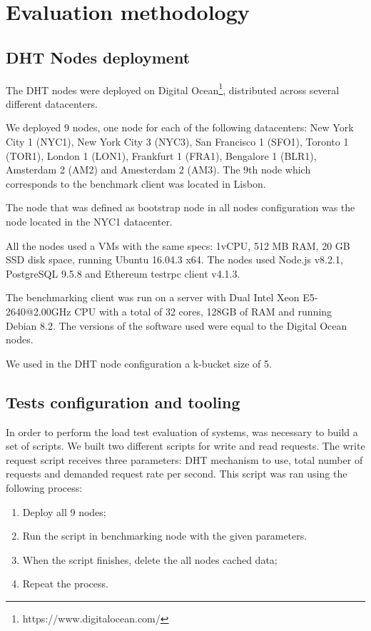 \section{Evaluation methodology}
\label{section:methodology}

\subsection{DHT Nodes deployment}


The DHT nodes were deployed on Digital Ocean\footnote{https://www.digitalocean.com/}, distributed across several different datacenters.

We deployed 9 nodes, one node for each of the following datacenters: New York City 1 (NYC1), New York City 3 (NYC3), San Francisco 1 (SFO1), Toronto 1 (TOR1), London 1 (LON1), Frankfurt 1 (FRA1), Bengalore 1 (BLR1), Amsterdam 2 (AM2) and Amesterdam 2 (AM3).
The 9th node which corresponds to the benchmark client was located in Lisbon.

The node that was defined as bootstrap node in all nodes configuration was the node located in the NYC1 datacenter.

All the nodes used a \acp{VM} with the same specs: 1vCPU, 512 MB RAM, 20 GB SSD disk space, running Ubuntu 16.04.3 x64.
The nodes used Node.js v8.2.1, PostgreSQL 9.5.8 and Ethereum testrpc client v4.1.3.

The benchmarking client was run on a server with Dual Intel Xeon E5-2640@2.00GHz CPU with a total of 32 cores, 128GB of RAM and running Debian 8.2.
The versions of the software used were equal to the Digital Ocean nodes.

We used in the DHT node configuration a k-bucket size of 5.

\subsection{Tests configuration and tooling}

In order to perform the load test evaluation of systems, was necessary to build a set of scripts.
We built two different scripts for write and read requests.
The write request script receives three parameters: DHT mechanism to use, total number of requests and demanded request rate per second.
This script was ran using the following process:

\begin{enumerate}
  \item Deploy all 9 nodes;
  \item Run the script in benchmarking node with the given parameters.
  \item When the script finishes, delete the all nodes cached data;
  \item Repeat the process.
\end{enumerate}


